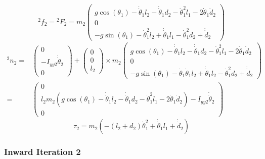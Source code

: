 \documentclass[10pt,a4paper]{article}
\begin{document}
\begin{equation*}
  {}^{2}f_{2} = {}^{2}F_{2} = m_{2}\begin{pmatrix}
    g\cos(\theta_{1}) - \dot{\dot{\theta}}_{1}l_{2} - \dot{\dot{\theta}}_{1}d_{2} - \dot{\theta}_{1}^{2}l_{1} - 2\dot{\theta}_{1}\dot{d}_{2}\\
    0\\
    -g\sin(\theta_{1}) - \dot{\theta}_{1}^{2}l_{2} + \dot{\dot{\theta}}_{1}l_{1} - \dot{\theta}_{1}^{2}d_{2} + \dot{\dot{d}}_{2}
  \end{pmatrix}
\end{equation*}
\begin{align*}
  {}^{2}n_{2} = & \begin{pmatrix}
    0\\
    -I_{yy2}\dot{\dot{\theta}}_{2}\\
    0
  \end{pmatrix} + \begin{pmatrix}
    0\\0\\l_{2}
  \end{pmatrix} \times m_{2}\begin{pmatrix}
    g\cos(\theta_{1}) - \dot{\dot{\theta}}_{1}l_{2} - \dot{\dot{\theta}}_{1}d_{2} - \dot{\theta}_{1}^{2}l_{1} - 2\dot{\theta}_{1}\dot{d}_{2}\\
    0\\
    -g\sin(\theta_{1}) - \dot{\theta}_{1}\dot{\theta}_{1}l_{2} + \dot{\dot{\theta}}_{1}l_{2} - \dot{\theta}_{1}^{2}d_{2} + \dot{\dot{d}}_{2}
  \end{pmatrix}\\
  = & \begin{pmatrix}
    0\\
    l_{2}m_{2}\left( g\cos(\theta_{1}) -\dot{\dot{\theta}}_{1}l_{2} - \dot{\dot{\theta}}_{1}d_{2} - \dot{\theta}_{1}^{2}l_{1} - 2\dot{\theta}_{1}\dot{d}_{2} \right) - I_{yy2}\dot{\dot{\theta}}_{2}\\
    0
  \end{pmatrix}
\end{align*}
\begin{equation*}
  \tau_{2} = m_{2}\left( -(l_{2} + d_{2})\dot{\theta}_{1}^{2} + \dot{\dot{\theta}}_{1}l_{1} + \dot{\dot{d}}_{2} \right)
\end{equation*}

\subsubsection*{Inward Iteration 2}
\end{document}
